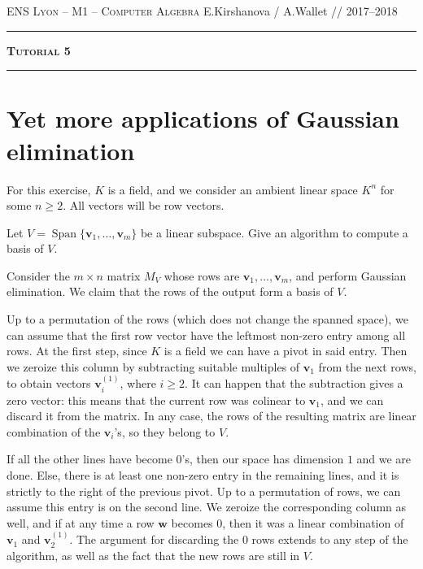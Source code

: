 \documentclass[11pt]{exam}
\theoremstyle{definition}
\DeclareMathOperator{\Span}{Span}
\newcommand{\vc}[1]{\mathbf{#1}}
\begin{document}
{\noindent
   \textsc{ENS Lyon --  M1 -- Computer Algebra}
   \hfill {E.Kirshanova / A.Wallet // 2017--2018\\
  }
  \hrule
  \begin{center}
    {\Large\textbf{
   \textsc{Tutorial 5}
    } } 
  \end{center}
  \hrule \vspace{5mm}

\thispagestyle{empty}

\vspace{0.2cm}

\section{Yet more applications of Gaussian elimination}

For this exercise, $K$ is a field, and we consider an ambient linear space $K^n$ for some $n\geq 2$. All vectors will be row vectors.

\begin{questions}
  \question Let $V=\Span\{\vc v_1, \dotsc, \vc v_m\}$ be a linear subspace. Give an algorithm to compute a basis of $V$.

  \begin{solution}
    Consider the $m\times n$ matrix $M_V$ whose rows are $\vc v_1, \dotsc, \vc v_m$, and perform Gaussian elimination. We claim that the rows of the output form a basis of $V$.
    
    Up to a permutation of the rows (which does not change the spanned space), we can assume that the first row vector have the leftmost non-zero entry among all rows. At the first step, since $K$ is a field we can have a pivot in said entry. Then we zeroize this column by subtracting suitable multiples of $\vc v_1$ from the next rows, to obtain vectors $\vc v_i^{(1)}$, where $i\geq 2$. It can happen that the subtraction gives a zero vector: this means that the current row was colinear to $\vc v_1$, and we can discard it from the matrix. In any case, the rows of the resulting matrix are linear combination of the $\vc v_i$'s, so they belong to $V$.

    If all the other lines have become $0$'s, then our space has dimension $1$ and we are done. Else, there is at least one non-zero entry in the remaining lines, and it is strictly to the right of the previous pivot. Up to a permutation of rows, we can assume this entry is on the second line. We zeroize the corresponding column as well, and if at any time a row $\vc w$ becomes $0$, then it was a linear combination of $\vc v_1$ and $\vc v_2^{(1)}$. The argument for discarding the $0$ rows extends to any step of the algorithm, as well as the fact that the new rows are still in $V$.


\end{solution}
\end{questions}}
\end{document}
